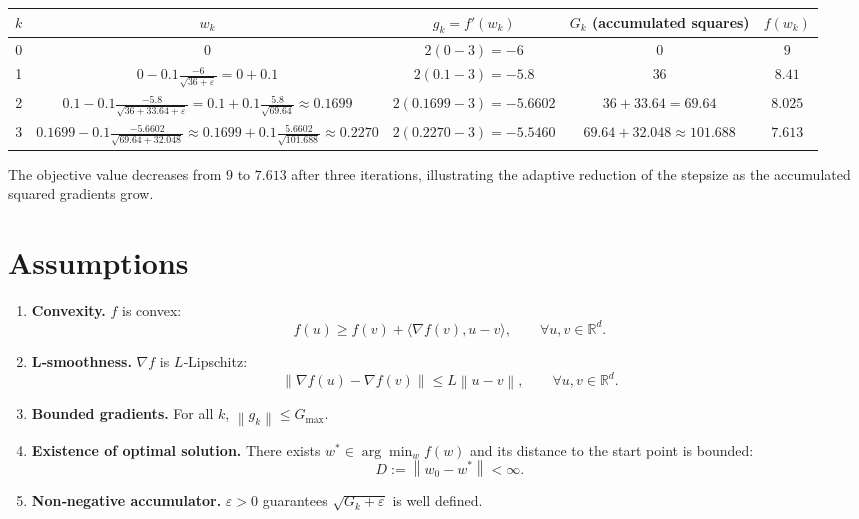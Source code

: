 \documentclass{article}
\newcommand{\R}{\mathbb{R}}
\newcommand{\norm}[1]{\left\lVert #1 \right\rVert}
\begin{document}
\begin{center}
\begin{tabular}{c|c|c|c|c}
$k$ & $w_{k}$ & $g_{k}=f'(w_{k})$ & $G_{k}$ (accumulated squares) & $f(w_{k})$\\ \hline
0 & $0$ & $2(0-3)=-6$ & $0$ & $9$\\
1 & $0-0.1\frac{-6}{\sqrt{36+\varepsilon}}=0+0.1$ & $2(0.1-3)=-5.8$ & $36$ & $8.41$\\
2 & $0.1-0.1\frac{-5.8}{\sqrt{36+33.64+\varepsilon}}=0.1+0.1\frac{5.8}{\sqrt{69.64}}\approx0.1699$ &
 $2(0.1699-3)=-5.6602$ &
 $36+33.64=69.64$ &
 $8.025$\\
3 & $0.1699-0.1\frac{-5.6602}{\sqrt{69.64+32.048}} 
      \approx0.1699+0.1\frac{5.6602}{\sqrt{101.688}}
      \approx0.2270$ &
 $2(0.2270-3)=-5.5460$ &
 $69.64+32.048\approx101.688$ &
 $7.613$\\
\end{tabular}
\end{center}
The objective value decreases from $9$ to $7.613$ after three iterations, illustrating the adaptive reduction of the stepsize as the accumulated squared gradients grow.

\newpage
\section*{Assumptions}
\begin{enumerate}
\item \textbf{Convexity.} $f$ is convex:
\[
f(u)\ge f(v)+\langle\nabla f(v),u-v\rangle,\qquad\forall u,v\in\R^{d}.
\tag{A1}
\]
\item \textbf{L‑smoothness.} $\nabla f$ is $L$‑Lipschitz:
\[
\norm{\nabla f(u)-\nabla f(v)}\le L\norm{u-v},\qquad\forall u,v\in\R^{d}.
\tag{A2}
\]
\item \textbf{Bounded gradients.} For all $k$, $\norm{g_{k}}\le G_{\max}$.
\item \textbf{Existence of optimal solution.} There exists $w^{*}\in\arg\min_{w}f(w)$ and its distance to the start point is bounded:
\[
D:=\norm{w_{0}-w^{*}}<\infty .
\tag{A3}
\]
\item \textbf{Non‑negative accumulator.} $\varepsilon>0$ guarantees $\sqrt{G_{k}+\varepsilon}$ is well defined.
\end{enumerate}
\end{document}
